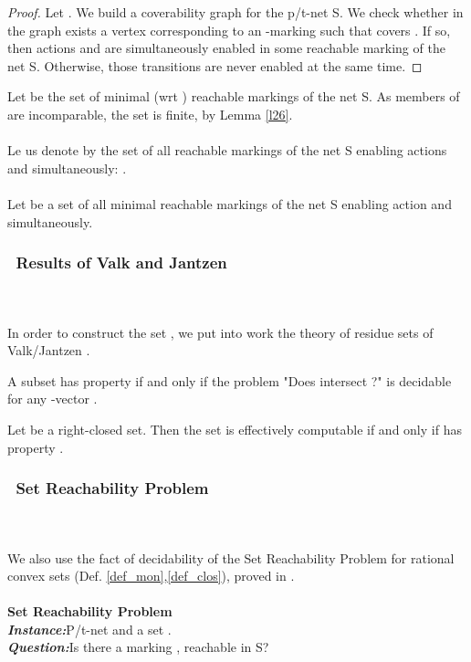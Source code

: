 \documentclass[a4paper]{llncs}
\begin{document}
\begin{proof}
Let . We build a coverability graph for the p/t-net S. We check whether in the graph exists a vertex corresponding to an -marking  such that  covers . If so, then actions  and  are simultaneously enabled in some reachable marking of the net S. Otherwise, those transitions are never enabled at the same time. 	
\end{proof}
Let  be the set of minimal (wrt ) reachable markings of the net S. As members of  are incomparable, the set   is finite, by Lemma \ref{l26}.\\ \\
Le us denote by  the set of all reachable markings of the net S enabling actions  and  simultaneously: . \\ \\
Let   be a set of all minimal reachable markings of the net S enabling action  and  simultaneously.


\subsubsection{\textbullet \ Results of Valk and Jantzen}\mbox{ }\\
\\
In order to construct the set , we put into work the theory of residue sets of Valk/Jantzen \cite{ValkJantzen}.

\begin{definition}
A subset  has property   if and only if the problem "Does   intersect ?" is decidable for any  -vector .
\end{definition}

\begin{theorem}
\label{twValk}
Let  be a right-closed set. Then the set  is effectively computable if and only if  has property .
\end{theorem}

\subsubsection{\textbullet \ Set Reachability Problem}\mbox{ }\\
\\
We also use the fact of decidability of the Set Reachability Problem for rational convex sets (Def. \ref{def_mon},\ref{def_clos}), proved in  \cite{BarOch}.
\\ \\
\textbf{Set Reachability Problem}
\\
\indent\textbf{\emph{Instance:}}P/t-net  and a set .\\
\indent\textbf{\emph{Question:}}Is there a marking , reachable in S? \\
\end{document}
